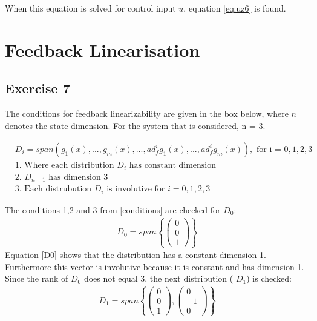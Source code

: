 \documentclass[a4paper,12pt]{article}
\begin{document}
When this equation is solved for control input $u$, equation \ref{eq:uz6} is found.

\newpage
\section{Feedback Linearisation}
\subsection{Exercise 7}
The conditions for feedback linearizability are given in the box below, where $n$ denotes the state dimension. For the system that is considered, n = 3.

\noindent\makebox[\linewidth]{\rule{\textwidth}{0.4pt}}
\begin{align}\label{conditions}
&D_i=span(g_1(x),...,g_m(x),...,ad^i_fg_1(x),...,ad^i_fg_m(x)),\textrm{ for i = $0,1,2,3$}\\ \nonumber
&\textrm{1. Where each distribution $D_i$ has constant dimension}\\ \nonumber
&\textrm{2. $D_{n-1}$ has dimension 3}\\ \nonumber
&\textrm{3. Each distrubution $D_i$ is involutive for $i=0,1,2,3$}
\end{align}
\noindent\makebox[\linewidth]{\rule{\textwidth}{0.4pt}}

The conditions 1,2 and 3 from \ref{conditions} are checked for $D_0$:
\begin{align}\label{D0}
D_0=span\left\{\begin{pmatrix} 0\\0\\1  \end{pmatrix}\right\}
\end{align}
Equation \ref{D0} shows that the distribution has a constant dimension 1. Furthermore this vector is involutive because it is constant and has dimension 1. Since the rank of $D_0$ does not equal 3, the next distribution ( $D_1$) is checked:
\begin{align}\label{D1}
D_1=span\left\{\begin{pmatrix} 0 \\ 0 \\ 1 \end{pmatrix} , \begin{pmatrix}
0 \\ -1 \\ 0\end{pmatrix} \right\}
\end{align}
\end{document}
